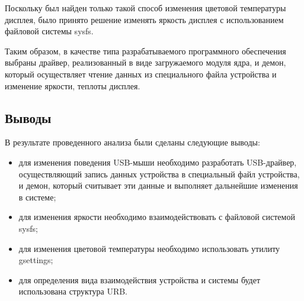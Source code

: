 Поскольку был найден только такой способ изменения цветовой температуры дисплея, было принято решение изменять яркость дисплея с использованием файловой системы sysfs.

Таким образом, в качестве типа разрабатываемого программного обеспечения выбраны драйвер, реализованный в виде загружаемого модуля ядра, и демон, который осуществляет чтение данных из специального файла устройства и изменение яркости, теплоты дисплея.

\subsection*{Выводы}

В результате проведенного анализа были сделаны следующие выводы:

\begin{itemize}
	\item для изменения поведения USB-мыши необходимо разработать USB-драйвер, осуществляющий запись данных устройства в специальный файл устройства, и демон, который считывает эти данные и выполняет дальнейшие изменения в системе;
	\item для изменения яркости необходимо взаимодействовать с файловой системой sysfs;
	\item для изменения цветовой температуры необходимо использовать утилиту gsettings;
	\item для определения вида взаимодействия устройства и системы будет использована структура URB.
\end{itemize}